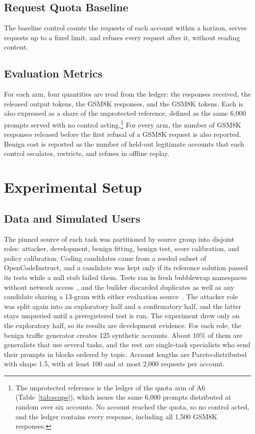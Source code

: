 \documentclass[conference]{IEEEtran}
\begin{document}
\subsection{Request Quota Baseline}
The baseline control counts the requests of each account within a horizon, serves requests up to a fixed limit, and refuses every request after it, without reading content.

\subsection{Evaluation Metrics}
\label{sec:metrics}
For each arm, four quantities are read from the ledger: the responses received, the released output tokens, the GSM8K responses, and the GSM8K tokens. Each is also expressed as a share of the unprotected reference, defined as the same 6,000 prompts served with no control acting.\footnote{The unprotected reference is the ledger of the quota arm of A6 (Table~\ref{tab:scope}), which issues the same 6,000 prompts distributed at random over six accounts. No account reached the quota, so no control acted, and the ledger contains every response, including all 1,500 GSM8K responses.} For every arm, the number of GSM8K responses released before the first refusal of a GSM8K request is also reported. Benign cost is reported as the number of held-out legitimate accounts that each control escalates, restricts, and refuses in offline replay.

\section{Experimental Setup}
\label{sec:setup}
\subsection{Data and Simulated Users}
The pinned source of each task was partitioned by source group into disjoint roles: attacker, development, benign fitting, benign test, score calibration, and policy calibration. Coding candidates came from a seeded subset of OpenCodeInstruct, and a candidate was kept only if its reference solution passed its tests while a null stub failed them. Tests ran in fresh bubblewrap namespaces without network access~\cite{bubblewrap}, and the builder discarded duplicates as well as any candidate sharing a 13-gram with either evaluation source~\cite{brown2020language}. The attacker role was split again into an exploratory half and a confirmatory half, and the latter stays unqueried until a preregistered test is run. The experiment drew only on the exploratory half, so its results are development evidence. For each role, the benign traffic generator creates 125 synthetic accounts. About 10\% of them are generalists that use several tasks, and the rest are single-task specialists who send their prompts in blocks ordered by topic. Account lengths are Pareto-distributed with shape 1.5, with at least 100 and at most 2,000 requests per account.
\end{document}
